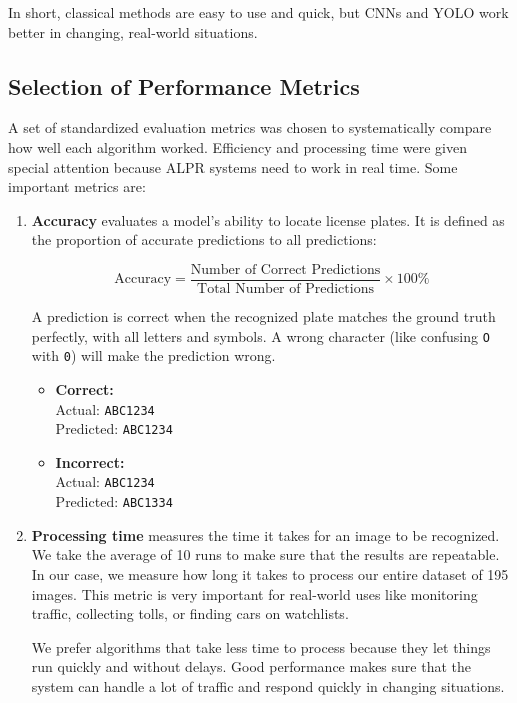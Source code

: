 \documentclass[runningheads]{llncs}
\begin{document}
In short, classical methods are easy to use and quick, but CNNs and YOLO work better in changing, real-world situations.


\subsection{Selection of Performance Metrics}
A set of standardized evaluation metrics was chosen to systematically compare how well each algorithm worked. Efficiency and processing time were given special attention because ALPR systems need to work in real time. Some important metrics are:

\begin{enumerate}
    \item \textbf{Accuracy} evaluates a model's ability to locate license plates. It is defined as the proportion of accurate predictions to all predictions:

    \begin{equation}
        \text{Accuracy} = \frac{\text{Number of Correct Predictions}}{\text{Total Number of Predictions}} \times 100\%
    \end{equation}

    A prediction is correct when the recognized plate matches the ground truth perfectly, with all letters and symbols. A wrong character (like confusing \texttt{O} with \texttt{0}) will make the prediction wrong.

    \begin{itemize}
        \item \textbf{Correct:} \\
        Actual: \texttt{ABC1234} \\
        Predicted: \texttt{ABC1234}
        
        \item \textbf{Incorrect:} \\
        Actual: \texttt{ABC1234} \\
        Predicted: \texttt{ABC1334}
    \end{itemize}

    \item \textbf{Processing time} measures the time it takes for an image to be recognized. We take the average of 10 runs to make sure that the results are repeatable. In our case, we measure how long it takes to process our entire dataset of 195 images. This metric is very important for real-world uses like monitoring traffic, collecting tolls, or finding cars on watchlists.

We prefer algorithms that take less time to process because they let things run quickly and without delays. Good performance makes sure that the system can handle a lot of traffic and respond quickly in changing situations.
\end{enumerate}
\end{document}
